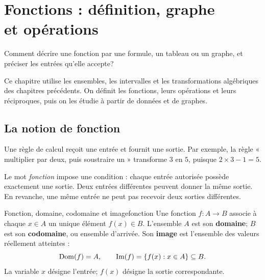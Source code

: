 \chapter[Fonctions : définition, graphe et opérations]{Fonctions : définition, graphe\\et opérations}
\label{manual:chapter:03}

\begin{questionbox}
Comment décrire une fonction par une formule, un tableau ou un graphe, et préciser les entrées qu'elle accepte?
\end{questionbox}

Ce chapitre utilise les ensembles, les intervalles et les transformations algébriques des chapitres précédents. On définit les fonctions, leurs opérations et leurs réciproques, puis on les étudie à partir de données et de graphes.

\section{La notion de fonction}
\label{manual:section:03.01}

Une règle de calcul reçoit une entrée et fournit une sortie. Par exemple, la règle « multiplier par deux, puis soustraire un » transforme \(3\) en \(5\), puisque \(2\times3-1=5\).

\begin{center}
\end{center}

\begin{intuitionbox}
Le mot \emph{fonction} impose une condition : chaque entrée autorisée possède exactement une sortie. Deux entrées différentes peuvent donner la même sortie. En revanche, une même entrée ne peut pas recevoir deux sorties différentes.
\end{intuitionbox}

\begin{definition}{Fonction, domaine, codomaine et image}{fonction}
Une fonction \(f:A\to B\) associe à chaque \(x\in A\) un unique élément \(f(x)\in B\). L'ensemble \(A\) est son \textbf{domaine}; \(B\) est son \textbf{codomaine}, ou ensemble d'arrivée. Son \textbf{image} est l'ensemble des valeurs réellement atteintes :
\[
\operatorname{Dom}(f)=A,\qquad \operatorname{Im}(f)=\{f(x):x\in A\}\subseteq B.
\]
La variable \(x\) désigne l'entrée; \(f(x)\) désigne la sortie correspondante.
\end{definition}

